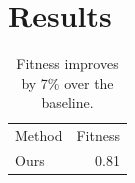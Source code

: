 \documentclass{article}
\begin{document}
\section{Results}
\begin{table}[t]
  \caption{Fitness improves by 7\% over the baseline.}
  \begin{tabular}{lr}
    Method & Fitness \\
    Ours & 0.81 \\
  \end{tabular}
\end{table}
\end{document}

